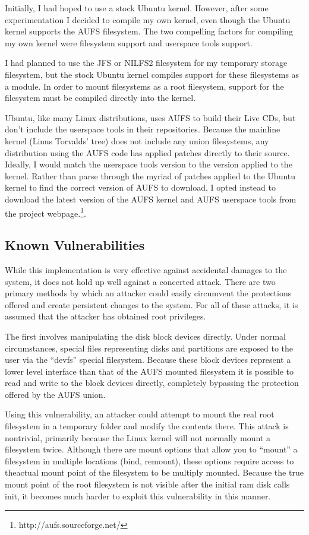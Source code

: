 \documentclass[12pt]{article}
\begin{document}
Initially, I had hoped to use a stock Ubuntu kernel.  However, after 
some experimentation I decided to compile my own kernel, even though the Ubuntu
kernel supports the AUFS filesystem.  The two compelling factors for compiling my own 
kernel were filesystem support and userspace tools support.  

I had planned to use the JFS or NILFS2 filesystem for my temporary storage 
filesystem, but the stock Ubuntu kernel compiles support for these 
filesystems as a module.  In order to mount filesystems as a root filesystem,
support for the filesystem must be compiled directly into the kernel.  

Ubuntu, like many
Linux distributions, uses AUFS to build their Live CDs, but don't include
the userspace tools in their repositories.  Because the mainline kernel (Linus
Torvalds' tree) does not include any union filesystems, any distribution using
the AUFS code has applied patches directly to their source. Ideally, I would 
match the userspace tools version to the version applied to the kernel.  
Rather than parse through the myriad of patches applied to the Ubuntu kernel 
to find the correct version of AUFS to download, I opted instead to download 
the latest version of the AUFS kernel and AUFS userspace tools from the 
project webpage.\footnote{http://aufs.sourceforge.net/}.  

\subsection{Known Vulnerabilities}
While this implementation is very effective against accidental damages to
the system, it does not hold up well against a concerted attack. There are two
primary methods by which an attacker could easily circumvent the protections
offered and create persistent changes to the system. For all of these attacks,
it is assumed that the attacker has obtained root privileges.

The first involves manipulating the disk block devices directly. 
Under normal circumstances, special files representing disks and partitions
are exposed to the user via the ``devfs'' special filesystem.  Because these 
block devices represent a lower level interface than that of the AUFS mounted
filesystem it is possible to read and write to the block devices directly, 
completely bypassing the protection offered by the AUFS union.

Using this vulnerability, an attacker could attempt to mount the real root
filesystem in a temporary folder and modify the contents there.  This attack 
is nontrivial, primarily because the Linux kernel will not normally mount
a filesystem twice.  Although there are mount options that allow you to 
``mount'' a filesystem in multiple locations (bind, remount), 
these options require access to theactual mount point of the filesystem to 
be multiply mounted. Because the true mount point of the root filesystem is
not visible after the initial ram disk calls init, it becomes much harder to
exploit this vulnerability in this manner.
\end{document}
